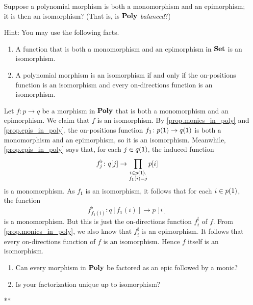 \documentclass[Book-Poly]{subfiles}
\begin{document}
\begin{exercise}
Suppose a polynomial morphism is both a monomorphism and an epimorphism; it is then an isomorphism? (That is, is $\mathbf{Poly}$ \emph{balanced}?)

Hint: You may use the following facts.
\begin{enumerate}
    \item A function that is both a monomorphism and an epimorphism in $\mathbf{Set}$ is an isomorphism.
    \item A polynomial morphism is an isomorphism if and only if the on-positions function is an isomorphism and every on-directions function is an isomorphism.
\end{enumerate}
\begin{solution}
Let $f \colon p \to q$ be a morphism in $\mathbf{Poly}$ that is both a monomorphism and an epimorphism.
We claim that $f$ is an isomorphism.
By \cref{prop.monics_in_poly} and \cref{prop.epis_in_poly}, the on-positions function $f_1 \colon p(\textsf{1}) \to q(\textsf{1})$ is both a monomorphism and an epimorphism, so it is an isomorphism.
Meanwhile, \cref{prop.epis_in_poly} says that, for each $j \in q(\textsf{1})$, the induced function
\[
    f^\flat_j \colon q[j] \to \prod_{\substack{i \in p(\textsf{1}), \\ f_1(i) = j}} p[i]
\]
is a monomorphism.
As $f_1$ is an isomorphism, it follows that for each $i \in p(\textsf{1})$, the function
\[
    f^\flat_{f_1(i)} \colon q[f_1(i)] \to p[i]
\]
is a monomorphism.
But this is just the on-directions function $f^\sharp_i$ of $f$.
From \cref{prop.monics_in_poly}, we also know that $f^\sharp_i$ is an epimorphism.
It follows that every on-directions function of $f$ is an isomorphism.
Hence $f$ itself is an isomorphism.
\end{solution}
\end{exercise}

\begin{exercise}\label{exc.mono_epi_poly}
\begin{enumerate}
	\item Can every morphism in $\mathbf{Poly}$ be factored as an epic followed by a monic?
	\item Is your factorization unique up to isomorphism?
\qedhere
\end{enumerate}
\begin{solution}
**
\end{solution}
\end{exercise}
\end{document}
